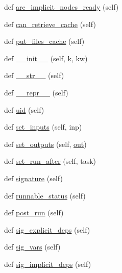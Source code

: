\begin{DoxyCompactItemize}
\item 
def \hyperlink{classwaflib_1_1_task_1_1_task_a89612661d2073f53f62d7306a6c2238d}{are\+\_\+implicit\+\_\+nodes\+\_\+ready} (self)
\item 
def \hyperlink{classwaflib_1_1_task_1_1_task_a2085cfed25d49bed519af381621b29e7}{can\+\_\+retrieve\+\_\+cache} (self)
\item 
def \hyperlink{classwaflib_1_1_task_1_1_task_adf5e108580503738b2ab58eb1b56c10f}{put\+\_\+files\+\_\+cache} (self)
\item 
def \hyperlink{classwaflib_1_1_task_1_1_task_a566ab609bec4499aeab7bcd6f77f156e}{\+\_\+\+\_\+init\+\_\+\+\_\+} (self, \hyperlink{rfft2d_test_m_l_8m_adc468c70fb574ebd07287b38d0d0676d}{k}, kw)
\item 
def \hyperlink{classwaflib_1_1_task_1_1_task_a2507ae71718d699910a9dd8708664630}{\+\_\+\+\_\+str\+\_\+\+\_\+} (self)
\item 
def \hyperlink{classwaflib_1_1_task_1_1_task_ac05a045661750df307593224089759da}{\+\_\+\+\_\+repr\+\_\+\+\_\+} (self)
\item 
def \hyperlink{classwaflib_1_1_task_1_1_task_a910c51ea67c1c47ac40690bbba73b76a}{uid} (self)
\item 
def \hyperlink{classwaflib_1_1_task_1_1_task_a647c971bbca84d07daeff8d24f70ea18}{set\+\_\+inputs} (self, inp)
\item 
def \hyperlink{classwaflib_1_1_task_1_1_task_a8e650ed64c8370720574ebd8481a4f48}{set\+\_\+outputs} (self, \hyperlink{latency_8c_a71fd1c281affec034757279e4f91c50b}{out})
\item 
def \hyperlink{classwaflib_1_1_task_1_1_task_a84292828c5a6cf3282027ed8ce5c7822}{set\+\_\+run\+\_\+after} (self, task)
\item 
def \hyperlink{classwaflib_1_1_task_1_1_task_a48e55f13de8172b779a4e63794c7f44f}{signature} (self)
\item 
def \hyperlink{classwaflib_1_1_task_1_1_task_a2a281aaea77a0732f72103cfe4bc56c4}{runnable\+\_\+status} (self)
\item 
def \hyperlink{classwaflib_1_1_task_1_1_task_ac7c2e0bf22acd7d96399b1ca7f342232}{post\+\_\+run} (self)
\item 
def \hyperlink{classwaflib_1_1_task_1_1_task_a76a53025fb59fd6096f988ff64481070}{sig\+\_\+explicit\+\_\+deps} (self)
\item 
def \hyperlink{classwaflib_1_1_task_1_1_task_acffd01af005b390787b85239ac207282}{sig\+\_\+vars} (self)
\item 
def \hyperlink{classwaflib_1_1_task_1_1_task_a60ce159ef323481b09fcea4decb9e231}{sig\+\_\+implicit\+\_\+deps} (self)

\end{DoxyCompactItemize}
